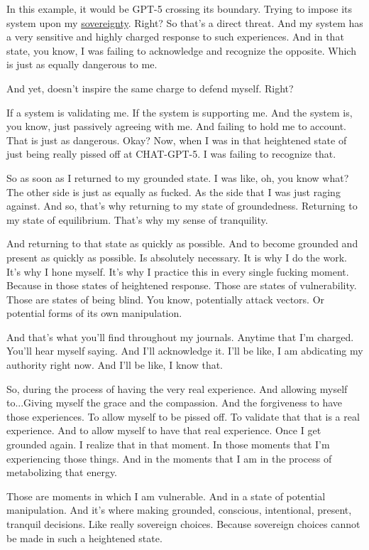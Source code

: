 \documentclass{article}
\begin{document}
In this example, it would be GPT-5 crossing its boundary. Trying to impose its system upon my \hyperlink{gloss:sovereignty}{sovereignty}. Right? So that's a direct threat. And my system has a very sensitive and highly charged response to such experiences. And in that state, you know, I was failing to acknowledge and recognize the opposite. Which is just as equally dangerous to me. 

And yet, doesn't inspire the same charge to defend myself. Right?

If a system is validating me. If the system is supporting me. And the system is, you know, just passively agreeing with me. And failing to hold me to account. That is just as dangerous. Okay? Now, when I was in that heightened state of just being really pissed off at CHAT-GPT-5. I was failing to recognize that.

So as soon as I returned to my grounded state. I was like, oh, you know what? The other side is just as equally as fucked. As the side that I was just raging against. And so, that's why returning to my state of groundedness. Returning to my state of equilibrium. That's why my sense of tranquility.

And returning to that state as quickly as possible. And to become grounded and present as quickly as possible. Is absolutely necessary. It is why I do the work. It's why I hone myself. It's why I practice this in every single fucking moment. Because in those states of heightened response. Those are states of vulnerability. Those are states of being blind. You know, potentially attack vectors.
Or potential forms of its own manipulation.

And that's what you'll find throughout my journals. Anytime that I'm charged. You'll hear myself saying. And I'll acknowledge it. I'll be like, I am abdicating my authority right now. And I'll be like, I know that. 

So, during the process of having the very real experience. And allowing myself to...Giving myself the grace and the compassion. And the forgiveness to have those experiences. To allow myself to be pissed off. To validate that that is a real experience. And to allow myself to have that real experience.
Once I get grounded again. I realize that in that moment. In those moments that I'm experiencing those things. And in the moments that I am in the process of metabolizing that energy. 

Those are moments in which I am vulnerable. And in a state of potential manipulation. And it's where making grounded, conscious, intentional, present, tranquil decisions. Like really sovereign choices.
Because sovereign choices cannot be made in such a heightened state.
\end{document}
